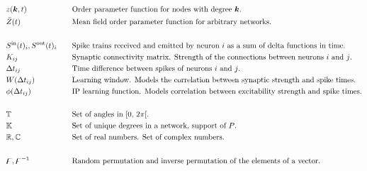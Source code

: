 \begin{alignat*}{2}
& z({\boldsymbol{k}}, t) &&\text{Order parameter function for nodes with degree ${\boldsymbol{k}}$.}\\
& \bar{Z}(t) &&\text{Mean field order parameter function for arbitrary networks.}\\ \\
& {S^{\rm in}}(t)_i, {S^{\rm out}}(t)_i \quad &&\text{Spike trains received and emitted by neuron $i$ as a sum of delta functions in time.}\\ 
& K_{ij} &&\text{Synaptic connectivity matrix. Strength of the connections between neurons $i$ and $j$.}\\
& \Delta t_{ij} &&\text{Time difference between spikes of neurons $i$ and $j$.}\\
& W(\Delta t_{ij}) &&\text{Learning window. Models the correlation between synaptic strength and spike times.}\\ 
& \phi(\Delta t_{ij}) &&\text{IP learning function. Models correlation between excitability strength and spike times.}\\ \\
& {\mathbb{T}} &&\text{Set of angles in [0, $2\pi$[.}\\
& {\mathbb{K}} &&\text{Set of unique degrees in a network, support of $P$.}\\ 
& {\mathbb{R}}, {\mathbb{C}} &&\text{Set of real numbers. Set of complex numbers.}\\ \\
& {\digamma}, {\digamma^{-1}} &&\text{Random permutation and inverse permutation of the elements of a vector.}\\ 
\end{alignat*}
